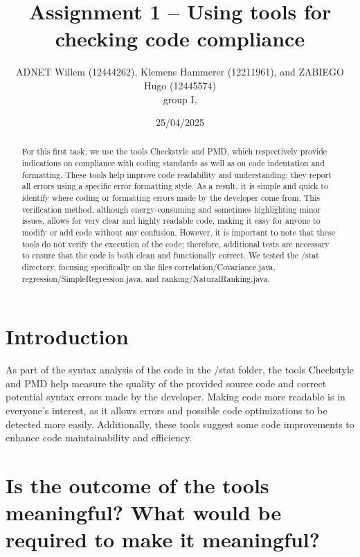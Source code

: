 \documentclass[twocolumn,10pt]{article}
\begin{document}
\title{Assignment 1 -- Using tools for checking code compliance}
\author{ADNET Willem (12444262), Klemens Hammerer (12211961), and ZABIEGO Hugo (12445574) \\
group I, 
}

\date{25/04/2025}




\maketitle

\begin{abstract}
For this first task, we use the tools Checkstyle and PMD, which respectively provide indications on compliance with coding standards as well as on code indentation and formatting. These tools help improve code readability and understanding; they report all errors using a specific error formatting style. As a result, it is simple and quick to identify where coding or formatting errors made by the developer come from.
This verification method, although energy-consuming and sometimes highlighting minor issues, allows for very clear and highly readable code, making it easy for anyone to modify or add code without any confusion.
However, it is important to note that these tools do not verify the execution of the code; therefore, additional tests are necessary to ensure that the code is both clean and functionally correct.
We tested the /stat directory, focusing specifically on the files correlation/Covariance.java, regression/SimpleRegression.java, and ranking/NaturalRanking.java.

\end{abstract}

\section{Introduction}

As part of the syntax analysis of the code in the /stat folder, the tools Checkstyle and PMD help measure the quality of the provided source code and correct potential syntax errors made by the developer. Making code more readable is in everyone's interest, as it allows errors and possible code optimizations to be detected more easily. Additionally, these tools suggest
some code improvements to enhance code maintainability and efficiency.

\section{ Is the outcome of the tools meaningful? What would be required to make it meaningful?}
\end{document}
